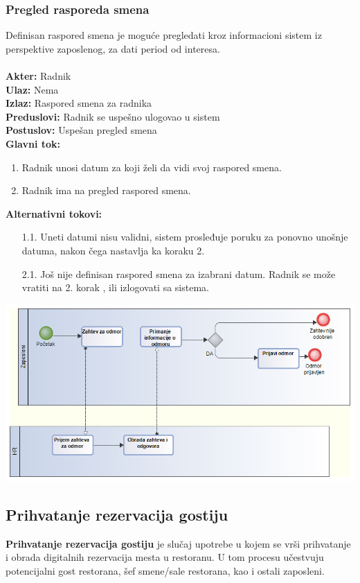 \documentclass{article}
\begin{document}
\subsubsection{Pregled rasporeda smena}
Definisan raspored smena je moguće pregledati kroz informacioni sistem iz perspektive zaposlenog, za dati period od interesa.\\\\
\textbf{Akter:} Radnik\\
\textbf{Ulaz:} Nema\\
\textbf{Izlaz:} Raspored smena za radnika\\
\textbf{Preduslovi:} Radnik se uspešno ulogovao u sistem\\
\textbf{Postuslov:} Uspešan pregled smena\\
\textbf{Glavni tok:}
\begin{enumerate}
\item Radnik unosi datum za koji želi da vidi svoj raspored smena.
\item Radnik ima na pregled raspored smena.
\end{enumerate}
\textbf{Alternativni tokovi:}\\
\begin{itemize}
\item [1.1.] Uneti datumi nisu validni, sistem prosleđuje poruku za ponovno unošnje datuma, nakon čega nastavlja ka koraku 2.
\item[2.1.] Još nije definisan raspored smena za izabrani datum. Radnik se može vratiti na 2. korak , ili izlogovati sa sistema.
\end{itemize}

\includegraphics[width=\textwidth]{SU_4_Odmor.png}\\


\subsection{Prihvatanje rezervacija gostiju}
\textbf{Prihvatanje rezervacija gostiju} je slučaj upotrebe u kojem se vrši prihvatanje i obrada digitalnih rezervacija mesta u restoranu. U tom procesu učestvuju potencijalni gost restorana, šef smene/sale restorana, kao i ostali zaposleni.\\
\end{document}
